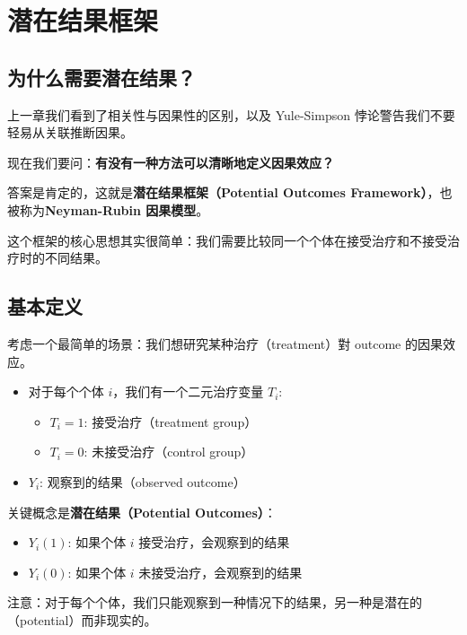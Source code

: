 
\chapter{潜在结果框架}

\section{为什么需要潜在结果？}

上一章我们看到了相关性与因果性的区别，以及 Yule-Simpson 悖论警告我们不要轻易从关联推断因果。

现在我们要问：\textbf{有没有一种方法可以清晰地定义因果效应？}

答案是肯定的，这就是\textbf{潜在结果框架（Potential Outcomes Framework）}，也被称为\textbf{Neyman-Rubin 因果模型}。

这个框架的核心思想其实很简单：我们需要比较同一个个体在接受治疗和不接受治疗时的不同结果。

\section{基本定义}

考虑一个最简单的场景：我们想研究某种治疗（treatment）對 outcome 的因果效应。

\begin{itemize}
  \item 对于每个个体 $i$，我们有一个二元治疗变量 $T_i$:
    \begin{itemize}
      \item $T_i = 1$: 接受治疗（treatment group）
      \item $T_i = 0$: 未接受治疗（control group）
    \end{itemize}
  \item $Y_i$: 观察到的结果（observed outcome）
\end{itemize}

关键概念是\textbf{潜在结果（Potential Outcomes）}：

\begin{itemize}
  \item $Y_i(1)$: 如果个体 $i$ 接受治疗，会观察到的结果
  \item $Y_i(0)$: 如果个体 $i$ 未接受治疗，会观察到的结果
\end{itemize}

注意：对于每个个体，我们只能观察到一种情况下的结果，另一种是潜在的（potential）而非现实的。

